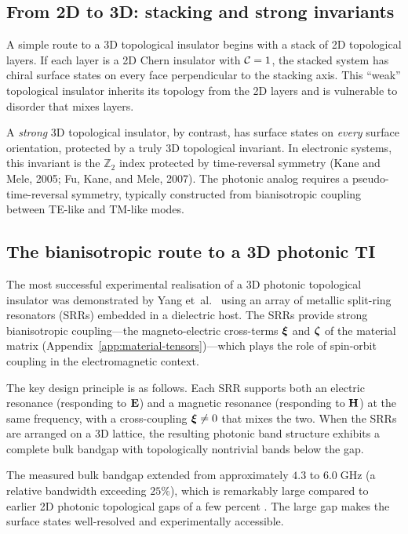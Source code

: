 \subsection{From 2D to 3D: stacking and strong invariants}
\label{sec:ch15-stacking-gapped}

A simple route to a 3D topological insulator begins with a stack of 2D
topological layers.  If each layer is a 2D Chern insulator with
$\mathcal{C}=1$, the stacked system has chiral surface states on every face
perpendicular to the stacking axis.  This ``weak'' topological
insulator inherits its topology from the 2D layers and is vulnerable to
disorder that mixes layers.

A \emph{strong} 3D topological insulator, by contrast, has surface
states on \emph{every} surface orientation, protected by a truly 3D
topological invariant.  In electronic systems, this invariant is the
$\mathbb{Z}_2$ index protected by time-reversal symmetry
(Kane and Mele, 2005; Fu, Kane, and Mele, 2007).  The photonic analog
requires a pseudo-time-reversal symmetry, typically constructed from
bianisotropic coupling between TE-like and TM-like modes.

\subsection{The bianisotropic route to a 3D photonic TI}
\label{sec:ch15-bianisotropic-3d}

The most successful experimental realisation of a 3D photonic
topological insulator was demonstrated by Yang et~al.\
\cite{yang2018realization} using an array of metallic split-ring
resonators (SRRs) embedded in a dielectric host.  The SRRs provide
strong bianisotropic coupling---the magneto-electric cross-terms
$\boldsymbol{\xi}$ and $\boldsymbol{\zeta}$ of the material matrix
(Appendix~\ref{app:material-tensors})---which plays the role of
spin-orbit coupling in the electromagnetic context.

The key design principle is as follows.  Each SRR supports both an
electric resonance (responding to $\mathbf{E}$) and a magnetic resonance
(responding to $\mathbf{H}$) at the same frequency, with a cross-coupling
$\boldsymbol{\xi}\neq 0$ that mixes the two.  When the SRRs are arranged on a
3D lattice, the resulting photonic band structure exhibits a complete
bulk bandgap with topologically nontrivial bands below the gap.

The measured bulk bandgap extended from approximately $4.3$ to
$6.0\;\mathrm{GHz}$ (a relative bandwidth exceeding $25\%$), which is
remarkably large compared to earlier 2D photonic topological gaps of a
few percent \cite{ozawa2018topological}.  The large gap makes the
surface states well-resolved and experimentally accessible.

